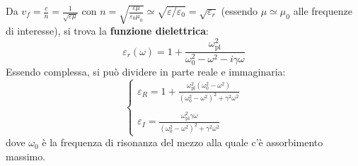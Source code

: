 \documentclass[a4paper]{scrartcl}
\numberwithin{equation}{subsection}
\theoremstyle{style1}
\begin{document}
Da $v_f = \frac{c}{n}= \frac{1}{\sqrt{\varepsilon \mu } }$ con $n = \sqrt{\frac{\varepsilon \mu }{\varepsilon _0 \mu_0}} \simeq \sqrt{\varepsilon / \varepsilon _0} = \sqrt{\varepsilon _r} $ (essendo $\mu \simeq \mu_0$ alle frequenze di interesse), si trova la \textbf{funzione dielettrica}:
\begin{equation}
	\varepsilon _r(\omega) = 1+ \frac{\omega_\text{pl}^2}{\omega_0^2 - \omega^2 - i\gamma\omega}
\end{equation}
Essendo complessa, si pu\`o dividere in parte reale e immaginaria:
\begin{equation}
	\begin{cases}
		\displaystyle \varepsilon _R = 1+ \frac{\omega_\text{pl}^2 (\omega_0^2 - \omega^2)}{(\omega_0^2 -\omega^2)^2+\gamma^2 \omega^2 }\\
		\\
		\displaystyle \varepsilon _I = \frac{\omega_\text{pl}^2 \gamma\omega}{(\omega_0^2 -\omega^2)^2+\gamma^2 \omega^2 }
	\end{cases}
\end{equation}
dove $\omega_0$ \`e la frequenza di risonanza del mezzo alla quale c'\`e assorbimento massimo.
\end{document}
